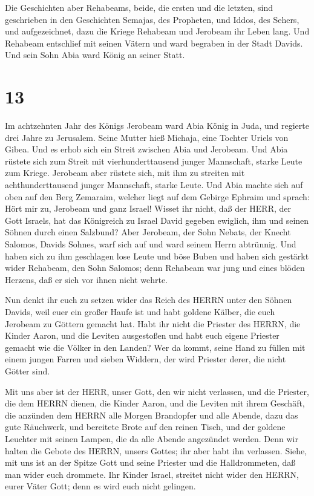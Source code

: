  Die Geschichten aber Rehabeams, beide, die ersten und die
letzten, sind geschrieben in den Geschichten Semajas, des Propheten, und
Iddos, des Sehers, und aufgezeichnet, dazu die Kriege Rehabeam und
Jerobeam ihr Leben lang.  Und Rehabeam entschlief mit
seinen Vätern und ward begraben in der Stadt Davids. Und sein Sohn Abia
ward König an seiner Statt.

\hypertarget{section-12}{%
\section{13}\label{section-12}}

 Im achtzehnten Jahr des Königs Jerobeam ward Abia König in
Juda,  und regierte drei Jahre zu Jerusalem. Seine Mutter
hieß Michaja, eine Tochter Uriels von Gibea. Und es erhob sich ein
Streit zwischen Abia und Jerobeam.  Und Abia rüstete sich
zum Streit mit vierhunderttausend junger Mannschaft, starke Leute zum
Kriege. Jerobeam aber rüstete sich, mit ihm zu streiten mit
achthunderttausend junger Mannschaft, starke Leute.  Und
Abia machte sich auf oben auf den Berg Zemaraim, welcher liegt auf dem
Gebirge Ephraim und sprach: Hört mir zu, Jerobeam und ganz Israel!
 Wisset ihr nicht, daß der HERR, der Gott Israels, hat das
Königreich zu Israel David gegeben ewiglich, ihm und seinen Söhnen durch
einen Salzbund?  Aber Jerobeam, der Sohn Nebats, der Knecht
Salomos, Davids Sohnes, warf sich auf und ward seinem Herrn abtrünnig.
 Und haben sich zu ihm geschlagen lose Leute und böse Buben
und haben sich gestärkt wider Rehabeam, den Sohn Salomos; denn Rehabeam
war jung und eines blöden Herzens, daß er sich vor ihnen nicht wehrte.

 Nun denkt ihr euch zu setzen wider das Reich des HERRN
unter den Söhnen Davids, weil euer ein großer Haufe ist und habt goldene
Kälber, die euch Jerobeam zu Göttern gemacht hat.  Habt ihr
nicht die Priester des HERRN, die Kinder Aaron, und die Leviten
ausgestoßen und habt euch eigene Priester gemacht wie die Völker in den
Landen? Wer da kommt, seine Hand zu füllen mit einem jungen Farren und
sieben Widdern, der wird Priester derer, die nicht Götter sind.

 Mit uns aber ist der HERR, unser Gott, den wir nicht
verlassen, und die Priester, die dem HERRN dienen, die Kinder Aaron, und
die Leviten mit ihrem Geschäft,  die anzünden dem HERRN
alle Morgen Brandopfer und alle Abende, dazu das gute Räuchwerk, und
bereitete Brote auf den reinen Tisch, und der goldene Leuchter mit
seinen Lampen, die da alle Abende angezündet werden. Denn wir halten die
Gebote des HERRN, unsers Gottes; ihr aber habt ihn verlassen.
 Siehe, mit uns ist an der Spitze Gott und seine Priester
und die Halldrommeten, daß man wider euch drommete. Ihr Kinder Israel,
streitet nicht wider den HERRN, eurer Väter Gott; denn es wird euch
nicht gelingen.

